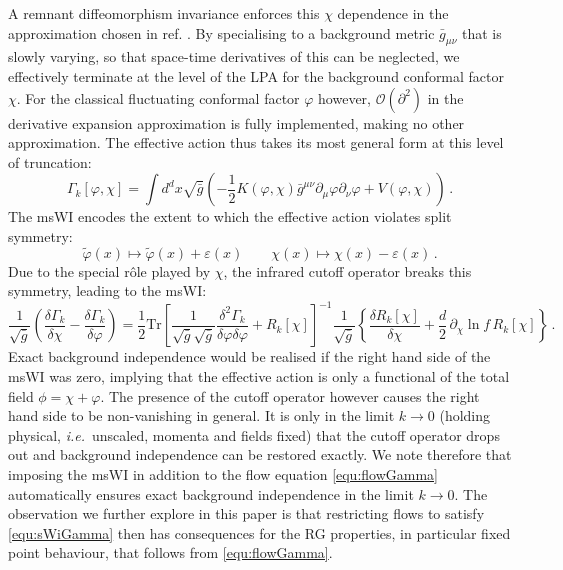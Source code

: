 \documentclass[11pt,a4paper]{article}
\numberwithin{figure}{section}
\numberwithin{equation}{section}
\newcommand\ie{\textit{i.e.}\ }
\newcommand{\be}{\begin{equation}}
\newcommand{\ee}{\end{equation}}
\newcommand{\eps}{\varepsilon}
\newcommand{\vp}{\varphi}  %
\newcommand{\dclnf}{\,\partial_\chi\! \ln\! f \,}
\begin{document}
A remnant diffeomorphism invariance enforces this $\chi$ dependence in the approximation chosen in ref. \cite{Dietz:2015owa}.
By specialising to a background metric ${\bar g}_{\mu\nu}$ that is slowly varying, so that space-time derivatives of this can be neglected, we
effectively terminate at the level of the LPA for the background conformal factor $\chi$. For the classical fluctuating conformal factor $\vp$ however,  $\mathcal{O}(\partial^2)$ in the derivative expansion approximation is fully implemented, making no other approximation.
The effective action thus takes its most general form at this level of truncation:
\begin{equation}
\label{trunc}
	\Gamma_k[\varphi, \chi] = \int d^dx \sqrt{\bar g} \left( -\frac{1}{2}K(\varphi,\chi)
	\bar g^{\mu\nu}\partial_{\mu}\varphi\partial_{\nu}\varphi + V(\varphi,\chi)  \right)\,.
\end{equation}
The msWI encodes the extent to which the effective action violates split symmetry:
\be
\label{equ:split-symmetry}
\tilde \vp(x) \mapsto \tilde \vp(x) + \eps(x) \qquad \chi(x) \mapsto \chi(x) -\eps(x)\,.
\ee
Due to the special r\^ole played by $\chi$, the infrared cutoff operator breaks this symmetry, leading to the msWI:
\be
\label{equ:sWiGamma}
\frac{1}{\sqrt{\bar g}}\left(\frac{\delta\Gamma_k}{\delta \chi}-\frac{\delta \Gamma_k}{\delta \vp}\right)
      =\frac{1}{2}\mathrm{Tr}\left[\frac{1}{\sqrt{\bar g}\sqrt{\bar g}}\frac{\delta^2\Gamma_k}
				  {\delta \vp \delta \vp}+ R_k[\chi]\right]^{-1} \frac{1}{\sqrt{\bar g}}
				  \left\{\frac{\delta R_k[\chi] }{\delta \chi}+\frac{d}{2}\dclnf R_k[\chi]\right\}\,.
\ee
Exact background independence would be realised if the right hand side of the msWI was zero, implying that the effective action is only a functional of the total field $\phi = \chi + \vp$. The presence of the cutoff operator however causes the right hand side to be non-vanishing in general. It is only in the limit $k\rightarrow0$ (holding physical, \ie unscaled, momenta and fields fixed) that the cutoff operator drops out and background independence can be restored exactly. We note therefore that imposing the msWI in addition to the flow equation \eqref{equ:flowGamma} automatically ensures exact background independence in the limit $k\rightarrow0$. The observation we further explore in this paper is that restricting flows to satisfy \eqref{equ:sWiGamma} then has consequences for the RG properties, in particular fixed point behaviour, that follows from \eqref{equ:flowGamma}.
\end{document}
